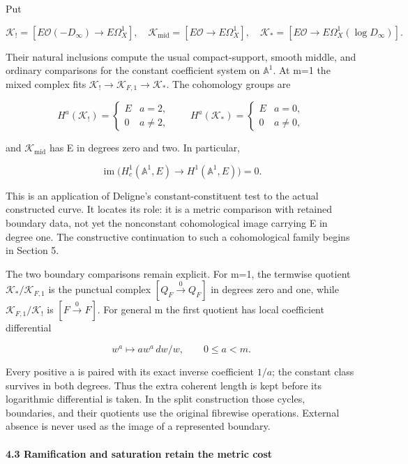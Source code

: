 Put

\[
\mathcal K_!=[E\mathcal O(-D_\infty)\to E\Omega_X^1],\quad
\mathcal K_{\mathrm{mid}}=[E\mathcal O\to E\Omega_X^1],\quad
\mathcal K_*=[E\mathcal O\to E\Omega_X^1(\log D_\infty)].
\tag{15}
\]

Their natural inclusions compute the usual compact-support, smooth middle, and ordinary comparisons for the constant coefficient system on \(\mathbb A^1\). At m=1 the mixed complex fits \(\mathcal K_!\to\mathcal K_{F,1}\to\mathcal K_*\). The cohomology groups are

\[
H^a(\mathcal K_!)=\begin{cases}E&a=2,\\0&a\ne2,\end{cases}
\qquad
H^a(\mathcal K_*)=\begin{cases}E&a=0,\\0&a\ne0,\end{cases}
\tag{16}
\]

and \(\mathcal K_{\mathrm{mid}}\) has E in degrees zero and two. In particular,

\[
\boxed{\operatorname{im}\bigl(H_c^1(\mathbb A^1,E)\to H^1(\mathbb A^1,E)\bigr)=0.}
\tag{17}
\]

This is an application of Deligne's constant-constituent test to the actual constructed curve. It locates its role: it is a metric comparison with retained boundary data, not yet the nonconstant cohomological image carrying E in degree one. The constructive continuation to such a cohomological family begins in Section 5.

The two boundary comparisons remain explicit. For m=1, the termwise quotient \(\mathcal K_*/\mathcal K_{F,1}\) is the punctual complex \([Q_F\xrightarrow{0}Q_F]\) in degrees zero and one, while \(\mathcal K_{F,1}/\mathcal K_!\) is \([F\xrightarrow{0}F]\). For general m the first quotient has local coefficient differential

\[
 w^a\longmapsto a w^a\,dw/w,\qquad 0\le a<m.
\tag{18}
\]

Every positive a is paired with its exact inverse coefficient \(1/a\); the constant class survives in both degrees. Thus the extra coherent length is kept before its logarithmic differential is taken. In the split construction those cycles, boundaries, and their quotients use the original fibrewise operations. External absence is never used as the image of a represented boundary.

\paragraph{4.3 Ramification and saturation retain the metric cost}\label{endpoint-exponential_original--ramification-and-saturation-retain-the-metric-cost}

